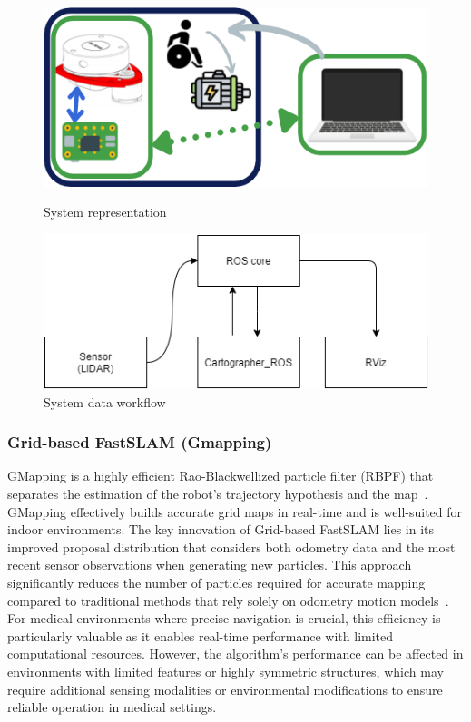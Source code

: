 \begin{figure}[H]
    \centering
    \begin{minipage}{0.41\textwidth}
        \centering
        \includegraphics[width=\linewidth]{pics/cart1.png}
        \caption[System representation]{System representation~\cite{ramadhan2021design}}\label{cart1}
    \end{minipage}\hfill
    \begin{minipage}{0.48\textwidth}
        \centering
        \includegraphics[width=\linewidth]{pics/cart2.png}
        \caption[System data workflow]{System data workflow~\cite{ramadhan2021design}}\label{cart2}
    \end{minipage}\hfill
\end{figure}

\vspace{0.25cm}

\subsubsection{Grid-based FastSLAM (Gmapping)}
GMapping is a highly efficient Rao-Blackwellized particle filter (RBPF) that separates the estimation of the
robot's trajectory hypothesis and the map~\cite{grisetti2007improved}. GMapping effectively builds accurate grid maps
in real-time and is well-suited for indoor environments. The key innovation of Grid-based FastSLAM lies
in its improved proposal distribution that considers both odometry data and the most recent sensor
observations when generating new particles. This approach significantly reduces the number of
particles required for accurate mapping compared to traditional methods that rely solely on odometry
motion models~\cite{1570477}. For medical environments where precise navigation is
crucial, this efficiency is particularly valuable as it enables real-time performance with limited
computational resources. However, the algorithm's performance can be affected in environments 
with limited features or highly symmetric structures, which may require additional sensing modalities or environmental modifications to ensure reliable operation in medical settings.


